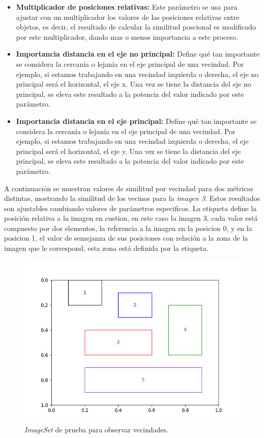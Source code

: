 \begin{itemize}
    \item \textbf{Multiplicador de posiciones relativas:} Este parámetro se usa para ajustar con un multiplicador los valores de las posiciones relativas entre objetos, es decir, el resultado de calcular la similitud poscional es modificado por este multiplicador, dando mas o menos importancia a este proceso. 

    \item \textbf{Importancia distancia en el eje no principal:} Define qué tan importante se considera la cercanía o lejanía en el eje principal de una vecindad. Por ejemplo, si estamos trabajando en una vecindad izquierda o derecha, el eje no principal será el horizontal, el eje x. Una vez se tiene la distancia del eje no principal, se eleva este resultado a la potencia del valor indicado por este par\'ametro.

    \item \textbf{Importancia distancia en el eje principal:} Define qué tan importante se considera la cercanía o lejanía en el eje principal de una vecindad. Por ejemplo, si estamos trabajando en una vecindad izquierda o derecha, el eje principal será el horizontal, el eje y. Una vez se tiene la distancia del eje principal, se eleva este resultado a la potencia del valor indicado por este par\'ametro.
\end{itemize}

A continuación se muestran valores de similitud por vecindad para dos métricas distintas, mostrando la similitud de los vecinos para la \textit{imagen 3}. Estos resultados son ajustables cambiando valores de parámetros especificos. La etiqueta define la posición relativa a la imagen en custion, en este caso la imagen 3, cada valor está compuesto por dos elementos, la referencia a la imagen en la posicion 0, y en la posicion 1, el valor de semejanza de sus posiciones con relación a la zona de la imagen que le correspond, esta zona est\'a definida por la etiqueta.

\begin{figure}[H]
\centering
 \includegraphics[width=\textwidth]{Graphics/regions.png}
\caption{\textit{ImageSet} de prueba para observar vecindades.}
\label{fig:neighbords}
\end{figure}

